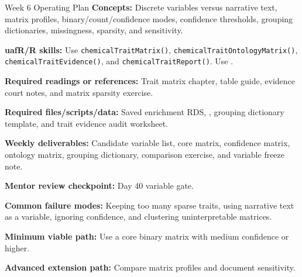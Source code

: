\begin{checklistbox}{Week 6 Operating Plan}
\textbf{Concepts:} Discrete variables versus narrative text, matrix profiles, binary/count/confidence modes, confidence thresholds, grouping dictionaries, missingness, sparsity, and sensitivity.

\textbf{uafR/R skills:} Use \texttt{chemicalTraitMatrix()}, \texttt{chemicalTraitOntologyMatrix()}, \texttt{chemicalTraitEvidence()}, and \texttt{chemicalTraitReport()}. Use .

\textbf{Required readings or references:} Trait matrix chapter, table guide, evidence court notes, and matrix sparsity exercise.

\textbf{Required files/scripts/data:} Saved enrichment RDS, , grouping dictionary template, and trait evidence audit worksheet.

\textbf{Weekly deliverables:} Candidate variable list, core matrix, confidence matrix, ontology matrix, grouping dictionary, comparison exercise, and variable freeze note.

\textbf{Mentor review checkpoint:} Day 40 variable gate.

\textbf{Common failure modes:} Keeping too many sparse traits, using narrative text as a variable, ignoring confidence, and clustering uninterpretable matrices.

\textbf{Minimum viable path:} Use a core binary matrix with medium confidence or higher.

\textbf{Advanced extension path:} Compare matrix profiles and document sensitivity.
\end{checklistbox}

